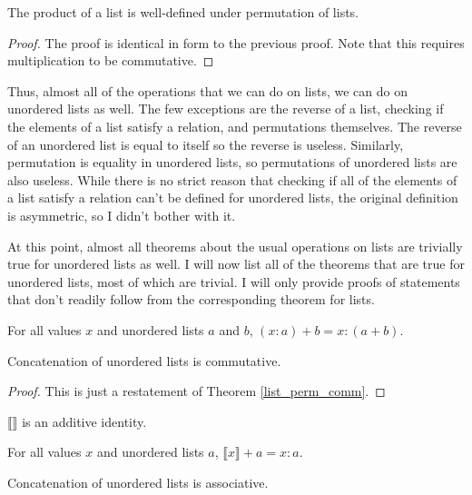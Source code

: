 \documentclass[../../math.tex]{subfiles}
\begin{document}
\begin{lemma}
    The product of a list is well-defined under permutation of lists.
\end{lemma}
\begin{proof}
    The proof is identical in form to the previous proof.  Note that this
    requires multiplication to be commutative.
\end{proof}

Thus, almost all of the operations that we can do on lists, we can do on
unordered lists as well.  The few exceptions are the reverse of a list, checking
if the elements of a list satisfy a relation, and permutations themselves.  The
reverse of an unordered list is equal to itself so the reverse is useless.
Similarly, permutation is equality in unordered lists, so permutations of
unordered lists are also useless.  While there is no strict reason that checking
if all of the elements of a list satisfy a relation can't be defined for
unordered lists, the original definition is asymmetric, so I didn't bother with
it.

At this point, almost all theorems about the usual operations on lists are
trivially true for unordered lists as well.  I will now list all of the theorems
that are true for unordered lists, most of which are trivial.  I will only
provide proofs of statements that don't readily follow from the corresponding
theorem for lists.

\begin{theorem} \label{ulist_conc_add}
    For all values $x$ and unordered lists $a$ and $b$, $(x : a) + b = x : (a +
    b)$.
\end{theorem}

\begin{instance}
    Concatenation of unordered lists is commutative.
\end{instance}
\begin{proof}
    This is just a restatement of Theorem \ref{list_perm_comm}.
\end{proof}

\begin{instance}
    $\llbracket \rrbracket$ is an additive identity.
\end{instance}

\begin{theorem} \label{ulist_conc_single}
    For all values $x$ and unordered lists $a$, $\llbracket x \rrbracket + a = x
    : a$.
\end{theorem}

\begin{instance}
    Concatenation of unordered lists is associative.
\end{instance}
\end{document}
